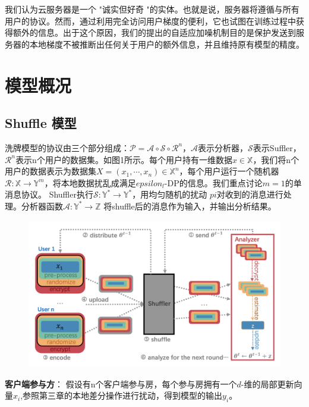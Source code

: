 我们认为云服务器是一个 "诚实但好奇 "的实体。也就是说，服务器将遵循与所有用户的协议。然而，通过利用完全访问用户梯度的便利，它也试图在训练过程中获得额外的信息。出于这个原因，我们的提出的自适应加噪机制目的是保护发送到服务器的本地梯度不被推断出任何关于用户的额外信息，并且维持原有模型的精度。

\section{模型概况}
\subsection{Shuffle 模型}
洗牌模型的协议由三个部分组成：$\mathcal{P}=\mathcal{A} \circ \mathcal{S} \circ \mathcal{R}^{n}$，$\mathcal{A}$表示分析器，$\mathcal{S}$表示Suffler，$\mathcal{R}^{n}$表示n个用户的数据集。如图1所示。每个用户持有一维数据$x \in \mathbb{X}$，我们将n个用户的数据表示为数据集$X=\left(x_{1}, \cdots, x_{n}\right) \in \mathbb{X}^{n}$，每个用户运行一个随机器$\mathcal{R}: \mathbb{X} \rightarrow \mathbb{Y}^{m}$，将本地数据扰乱成满足$epsilon_{l}$-DP的信息。我们重点讨论$m=1$的单消息协议。 Shuffler执行$\mathcal{S}: \mathbb{Y}^{*} \rightarrow \mathbb{Y}^{*}$，用均匀随机的扰动 $pi$对收到的消息进行处理。分析器函数$\mathcal{A}: \mathbb{Y}^{*} \rightarrow \mathbb{Z}$ 将shuffle后的消息作为输入，并输出分析结果。

\begin{figure}[!hbt]
\centering
  \includegraphics[scale=0.4]{fig2/C4/shuffle模型}%
  \label{fig:shuffle模型} 
\end{figure}

\textbf{客户端参与方}：
假设有n个客户端参与房，每个参与房拥有一个$d$-维的局部更新向量$x_{i}$,参照第三章的本地差分操作进行扰动，得到模型的输出$y_{i}$。

